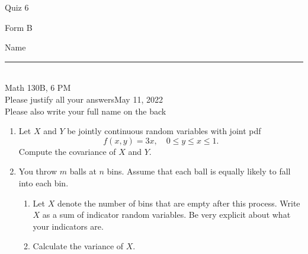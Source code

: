 \documentclass[12pt]{article}
\begin{document}
\begin{flushleft} 
\centerline{\LARGE{Quiz 6}} 
\vspace{5 mm}
{Form B}\hfill  
{Name \rule {2 in}{0.01in}}\\
Math 130B, 6 PM
\\
{Please justify all your answers}\hfill {May 11, 2022}
\\
{Please also write your full name on the back} 

\medskip
\end{flushleft}

\begin{enumerate}

	\item Let $X$ and $Y$ be jointly continuous random variables with joint pdf
	\[
		f(x,y) = 3x,\quad 0\leq y \leq x \leq 1.
	\]
	Compute the covariance of $X$ and $Y$.

	\vfill

	\item You throw $m$ balls at $n$ bins. Assume that each ball is equally likely to fall into each bin.
	\begin{enumerate}
		\item Let $X$ denote the number of bins that are empty after this process. Write $X$ as a sum of indicator random variables. Be very explicit about what your indicators are.
		\vfill

		\item Calculate the variance of $X$.
	\end{enumerate}

	\vfill\null
\end{enumerate}
\end{document}
